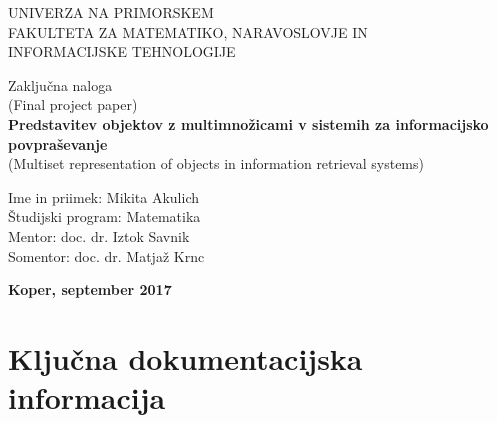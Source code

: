 \pagestyle{empty}
\begin{center}
\noindent \large UNIVERZA NA PRIMORSKEM\\
\large FAKULTETA ZA MATEMATIKO, NARAVOSLOVJE IN\\
INFORMACIJSKE TEHNOLOGIJE


\normalsize
\vspace{5.5cm}
Zaklju\v cna naloga\\
(Final project paper)\\
\textbf{\large Predstavitev objektov z multimno\v zicami v sistemih za informacijsko povpra\v sevanje}\\
\normalsize
(Multiset representation of objects in information retrieval systems)\\
\end{center}

\begin{flushleft}
\vspace{5cm}
\noindent Ime in priimek: Mikita Akulich
\\
\noindent \v Studijski program: Matematika
\\
\noindent Mentor: doc. dr. Iztok Savnik
\\
\noindent Somentor: doc. dr. Matja\v z Krnc
\\
\end{flushleft}

\vspace{4cm}
\begin{center}
\large \textbf{Koper, september 2017}
\end{center}
\newpage

\pagestyle{fancy}

\section*{Klju\v cna dokumentacijska informacija}

